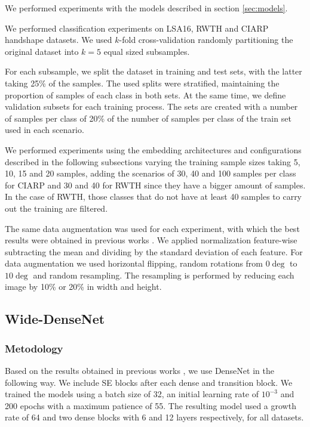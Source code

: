 We performed experiments with the models described in section \ref{sec:models}.

We performed classification experiments on LSA16, RWTH and CIARP handshape datasets. We used $k$-fold cross-validation \cite{Refaeilzadeh2009} randomly partitioning the original dataset into $k = 5$ equal sized subsamples.

For each subsample, we split the dataset in training and test sets, with the latter taking 25\% of the samples. The used splits were stratified, maintaining the proportion of samples of each class in both sets. At the same time, we define validation subsets for each training process. The sets are created with a number of samples per class of 20\% of the number of samples per class of the train set used in each scenario.

We performed experiments using the embedding architectures and configurations described in the following subsections varying the training sample sizes taking 5, 10, 15 and 20 samples, adding the scenarios of 30, 40 and 100 samples per class for CIARP and 30 and 40 for RWTH since they have a bigger amount of samples. In the case of RWTH, those classes that do not have at least 40 samples to carry out the training are filtered.

The same data augmentation was used for each experiment, with which the best results were obtained in previous works \cite{cornejo2019hand}. We applied normalization feature-wise subtracting the mean and dividing by the standard deviation of each feature. For data augmentation we used horizontal flipping,  random rotations from $0\deg$ to $10\deg$ and random resampling. The resampling is performed by reducing each image by 10\% or 20\% in width and height.

\subsection{Wide-DenseNet} \label{sec:experiments:densenet}

\subsubsection{Metodology}

Based on the results obtained in previous works \cite{cornejo2019hand}, we use DenseNet in the following way. We include SE blocks after each dense and transition block. We trained the models using a batch size of 32, an initial learning rate of $10^{-3}$ and 200 epochs with a maximum patience of 55. The resulting model used a growth rate of 64 and two dense blocks with 6 and 12 layers respectively, for all datasets.

